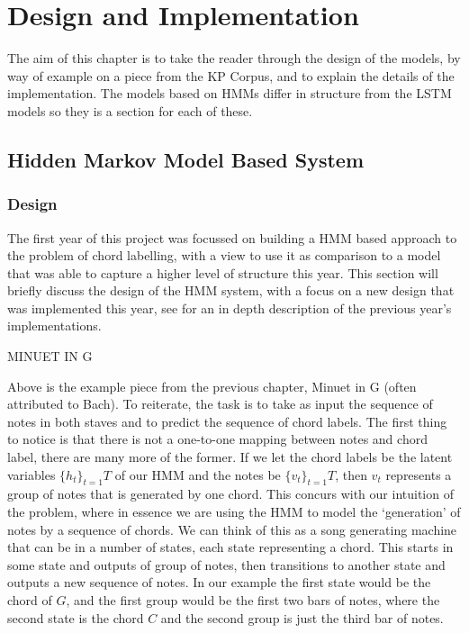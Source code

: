 \documentclass[bsc,singlespacing,logo, parskip, deptreport]{infthesis}
\begin{document}
\chapter{Design and Implementation}
The aim of this chapter is to take the reader through the design of the models, by way of example on a piece from the KP Corpus, and to explain the details of the implementation. The models based on HMMs differ in structure from the LSTM models so they is a section for each of these.

\section{Hidden Markov Model Based System}
\subsection{Design} \label{HMM DES}

The first year of this project was focussed on building a HMM based approach to the problem of chord labelling, with a view to use it as comparison to a model that was able to capture a higher level of structure this year. This section will briefly discuss the design of the HMM system, with a focus on a new design that was implemented this year, see \cite{self} for an in depth description of the previous year's implementations.

MINUET IN G

Above is the example piece from the previous chapter, Minuet in G (often attributed to Bach). To reiterate, the task is to take as input the sequence of notes in both staves and to predict the sequence of chord labels. The first thing to notice is that there is not a one-to-one mapping between notes and chord label, there are many more of the former. If we let the chord labels be the latent variables $\{h_t\}_{t=1}{T}$ of our HMM and the notes be $\{v_t\}_{t=1}{T}$, then $v_t$ represents a group of notes that is generated by one chord. This concurs with our intuition of the problem, where in essence we are using the HMM to model the `generation' of notes by a sequence of chords. We can think of this as a song generating machine that can be in a number of states, each state representing a chord. This starts in some state and outputs of group of notes, then transitions to another state and outputs a new sequence of notes. In our example the first state would be the chord of $G$, and the first group would be the first two bars of notes, where the second state is the chord $C$ and the second group is just the third bar of notes.
\end{document}
